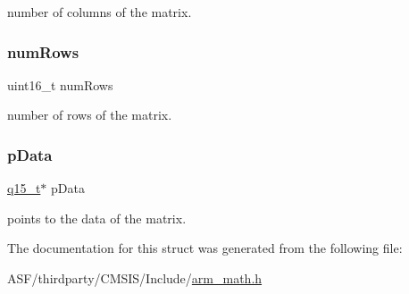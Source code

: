 number of columns of the matrix. \mbox{\label{structarm__matrix__instance__q15_a1bcf80ccdc2acc29198f1592ae300390}} 
\subsubsection{\texorpdfstring{numRows}{numRows}}
{\footnotesize\ttfamily uint16\+\_\+t num\+Rows}

number of rows of the matrix. \mbox{\label{structarm__matrix__instance__q15_a817ede38365e63e561a12069c6c5c087}} 
\subsubsection{\texorpdfstring{pData}{pData}}
{\footnotesize\ttfamily \mbox{\hyperlink{arm__math_8h_ab5a8fb21a5b3b983d5f54f31614052ea}{q15\+\_\+t}}$\ast$ p\+Data}

points to the data of the matrix. 

The documentation for this struct was generated from the following file\+:\begin{DoxyCompactItemize}
\item 
A\+S\+F/thirdparty/\+C\+M\+S\+I\+S/\+Include/\mbox{\hyperlink{arm__math_8h}{arm\+\_\+math.\+h}}\end{DoxyCompactItemize}
